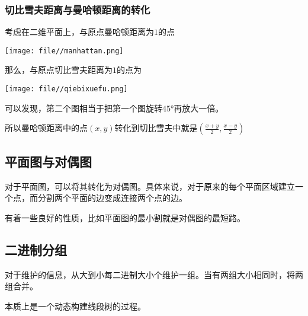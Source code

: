 \documentclass[UTF-8]{ctexart}
\begin{document}
	\subsubsection{切比雪夫距离与曼哈顿距离的转化}
	考虑在二维平面上，与原点曼哈顿距离为$1$的点
	
	\begin{center}
		\texttt{[image: file//manhattan.png]}
	\end{center}
	
	那么，与原点切比雪夫距离为$1$的点为 
	
	\begin{center}
		\texttt{[image: file//qiebixuefu.png]}
	\end{center}
	
	可以发现，第二个图相当于把第一个图旋转$45°$再放大一倍。  
	
	所以曼哈顿距离中的点$(x,y)$转化到切比雪夫中就是$(\frac{x+y}{2},\frac{x-y}{2})$	
	\subsection{平面图与对偶图}
	对于平面图，可以将其转化为对偶图。具体来说，对于原来的每个平面区域建立一个点，而分割两个平面的边变成连接两个点的边。
	
	有着一些良好的性质，比如平面图的最小割就是对偶图的最短路。
	\subsection{二进制分组}
	对于维护的信息，从大到小每二进制大小个维护一组。当有两组大小相同时，将两组合并。
	
	本质上是一个动态构建线段树的过程。
\end{document}
